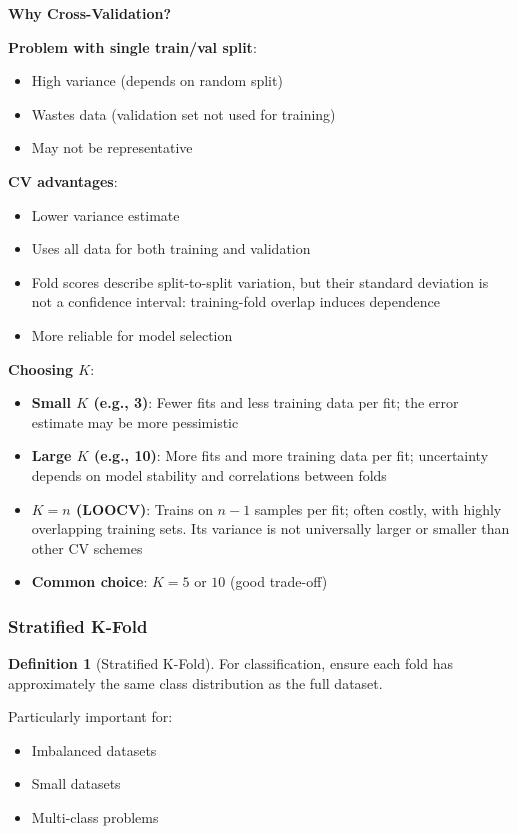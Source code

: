 \documentclass[11pt,twoside]{article}
\numberwithin{equation}{section}
\theoremstyle{plain}
\theoremstyle{definition}
\newtheorem{definition}[theorem]{Definition}
\theoremstyle{remark}
\newenvironment{keyidea}{
  \begin{tcolorbox}[colback=yellow!5!white,
                    colframe=yellow!50!black,
                    title=Key Idea,
                    breakable,
                    enhanced,
                    sharp corners,
                    boxrule=0.8pt,
                    left=6pt, right=6pt, top=6pt, bottom=6pt]
}{
  \end{tcolorbox}
}
\begin{document}
\begin{keyidea}
\textbf{Why Cross-Validation?}

\textbf{Problem with single train/val split}:
\begin{itemize}
\item High variance (depends on random split)
\item Wastes data (validation set not used for training)
\item May not be representative
\end{itemize}

\textbf{CV advantages}:
\begin{itemize}
\item Lower variance estimate
\item Uses all data for both training and validation
\item Fold scores describe split-to-split variation, but their standard deviation is not a confidence interval: training-fold overlap induces dependence
\item More reliable for model selection
\end{itemize}

\textbf{Choosing $K$}:
\begin{itemize}
\item \textbf{Small $K$ (e.g., 3)}: Fewer fits and less training data per fit; the error estimate may be more pessimistic
\item \textbf{Large $K$ (e.g., 10)}: More fits and more training data per fit; uncertainty depends on model stability and correlations between folds
\item \textbf{$K=n$ (LOOCV)}: Trains on $n-1$ samples per fit; often costly, with highly overlapping training sets. Its variance is not universally larger or smaller than other CV schemes
\item \textbf{Common choice}: $K = 5$ or $10$ (good trade-off)
\end{itemize}
\end{keyidea}

\subsubsection{Stratified K-Fold}

\begin{definition}[Stratified K-Fold]
For classification, ensure each fold has approximately the same class distribution as the full dataset.

Particularly important for:
\begin{itemize}
\item Imbalanced datasets
\item Small datasets
\item Multi-class problems
\end{itemize}
\end{definition}
\end{document}

